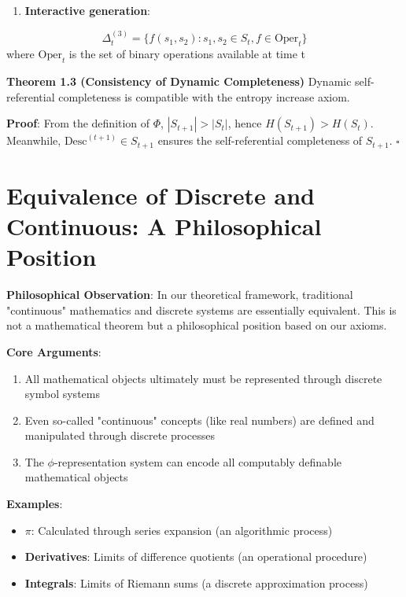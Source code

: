 \begin{enumerate}
\item \textbf{Interactive generation}:
\end{enumerate}
  
\begin{equation}
\Delta_t^{(3)} = \{f(s_1, s_2) : s_1, s_2 \in S_t, f \in \text{Oper}_t\}
\end{equation}
  where $\text{Oper}_t$ is the set of binary operations available at time t

\textbf{Theorem 1.3 (Consistency of Dynamic Completeness)}
\label{thm:1.3}
Dynamic self-referential completeness is compatible with the entropy increase axiom.

\textbf{Proof}:
From the definition of $\Phi$, $|S_{t+1}| > |S_t|$, hence $H(S_{t+1}) > H(S_t)$.
Meanwhile, $\text{Desc}^{(t+1)} \in S_{t+1}$ ensures the self-referential completeness of $S_{t+1}$. $\square$

\section{Equivalence of Discrete and Continuous: A Philosophical Position}
\label{sec:ch01_axiom_and_derivation:equivalence-of-discrete-and-continuous-a-philosophical-position}

\textbf{Philosophical Observation}: In our theoretical framework, traditional "continuous" mathematics and discrete systems are essentially equivalent. This is not a mathematical theorem but a philosophical position based on our axioms.

\textbf{Core Arguments}:
\begin{enumerate}
\item All mathematical objects ultimately must be represented through discrete symbol systems
\item Even so-called "continuous" concepts (like real numbers) are defined and manipulated through discrete processes
\item The $\phi$-representation system can encode all computably definable mathematical objects
\end{enumerate}

\textbf{Examples}:
\begin{itemize}
\item \textbf{$\pi$}: Calculated through series expansion (an algorithmic process)
\item \textbf{Derivatives}: Limits of difference quotients (an operational procedure)
\item \textbf{Integrals}: Limits of Riemann sums (a discrete approximation process)
\end{itemize}

